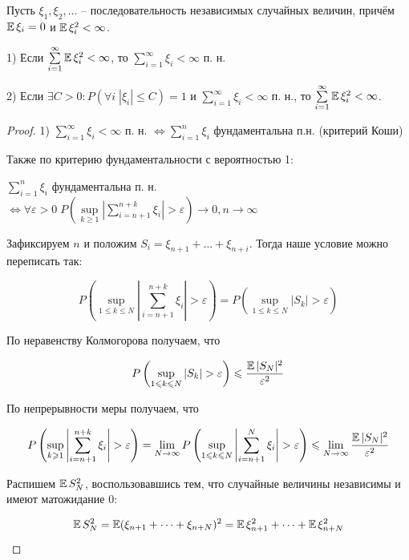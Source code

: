 \begin{theorem}
Пусть $\xi_1, \xi_2, \dots$ -- последовательность независимых случайных величин, причём
$\operatorname{\mathbb{E}} \xi_i = 0$ и $\operatorname{\mathbb{E}} \xi_i^2 < \infty$.

1) Если \( \sum \limits_{i = 1}^{\infty} \operatorname{\mathbb{E}} \xi_i^2 < \infty \), то 
\( \sum \limits_{i = 1}^{\infty} \xi_i < \infty \) п. н.

2) Если \( \exists C >0 : P(\forall i \; |\xi_i| \leqslant C) = 1 \) и
\( \sum \limits_{i = 1}^{\infty} \xi_i < \infty \) п. н., то 
\( \sum \limits_{i = 1}^{\infty} \operatorname{\mathbb{E}} \xi_i^2 < \infty \).
\end{theorem}

\begin{proof}

1) \( \sum \limits_{i = 1}^{\infty} \xi_i < \infty \) п. н. 
\( \Leftrightarrow \sum \limits_{i = 1}^n \xi_i \) фундаментальна п.н. (критерий Коши)

Также по критерию фундаментальности с вероятностью 1:

\( \sum \limits_{i = 1}^n \xi_i \) фундаментальна п. н. 
\( \Leftrightarrow \forall \varepsilon > 0 \;
P \left( \sup \limits_{k \geqslant 1} \left| \sum \limits_{i = n + 1}^{n + k} \xi_i \right| 
> \varepsilon \right) \to 0, n \to \infty \)

Зафиксируем $n$ и положим \( S_i = \xi_{n + 1} + \dots + \xi_{n + i} \).
Тогда наше условие можно переписать так:

\[
P \left( \sup_{1 \leqslant k \leqslant N} \left| \sum_{i = n + 1}^{n + k} \xi_i \right|
> \varepsilon \right) = P \left( \sup_{1 \leqslant k \leqslant N} |S_k| > \varepsilon \right)
\]

По неравенству Колмогорова получаем, что 

\[
P \left( \sup_{1 \leqslant k \leqslant N} |S_k| > \varepsilon \right) \leqslant
\frac{\operatorname{\mathbb{E}} |S_N|^2}{\varepsilon^2}
\]

По непрерывности меры получаем, что

\[
P \left( \sup_{k \geqslant 1} \left| \sum_{i = n + 1}^{n + k} \xi_i \right| 
> \varepsilon \right) = \lim_{N \to \infty} P \left( \sup_{1 \leqslant k \leqslant N}
\left| \sum_{i = n + 1}^{N} \xi_i \right| > \varepsilon \right) \leqslant
\lim_{N \to \infty} \frac{\operatorname{\mathbb{E}} |S_N|^2}{\varepsilon^2}
\]

Распишем $\operatorname{\mathbb{E}} S_N^2$, воспользовавшись тем, что случайные величины независимы и имеют
матожидание 0:

\[
\operatorname{\mathbb{E}} S_N^2 = \operatorname{\mathbb{E}} (\xi_{n + 1} + \dots + \xi_{n + N})^2 = \operatorname{\mathbb{E}} \xi_{n + 1}^2 + \dots + 
\operatorname{\mathbb{E}} \xi_{n + N}^2
\]


\end{proof}

